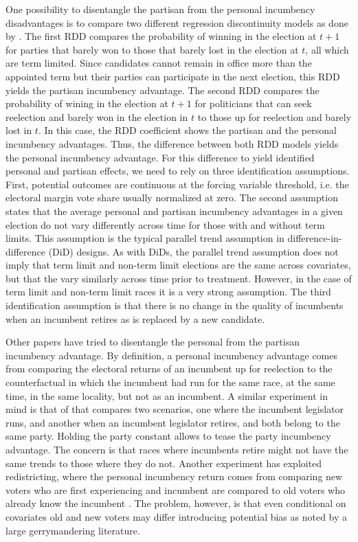 One possibility to disentangle the partisan from the personal incumbency disadvantages is to compare two different regression discontinuity models as done by \citet{fowler_hall_2014}. The first RDD compares the probability of winning in the election at $t+1$ for parties that barely won to those that barely lost in the election at $t$, all which are term limited. Since candidates cannot remain in office more than the appointed term but their parties can participate in the next election, this RDD yields the partisan incumbency advantage. The second RDD compares the probability of wining in the election at $t+1$ for politicians that can seek reelection and barely won in the election in $t$ to those up for reelection and barely lost in $t$. In this case, the RDD coefficient shows the partisan and the personal incumbency advantages. Thus, the difference between both RDD models yields the personal incumbency advantage. For this difference to yield identified personal and partisan effects, we need to rely on three identification assumptions. First, potential outcomes are continuous at the forcing variable threshold, i.e. the electoral margin vote share usually normalized at zero. The second assumption states that the average personal and partisan incumbency advantages in a given election do not vary differently across time for those with and without term limits. This assumption is the typical parallel trend assumption in difference-in-difference (DiD) designs. As with DiDs, the parallel trend assumption does not imply that term limit and non-term limit elections are the same across covariates, but that the vary similarly across time prior to treatment. However, in the case of term limit and non-term limit races it is a very strong assumption. The third identification assumption is that there is no change in the quality of incumbents when an incumbent retires as is replaced by a new candidate. 

Other papers have tried to disentangle the personal from the partisan incumbency advantage. By definition, a personal incumbency advantage comes from comparing the electoral returns of an incumbent up for reelection to the counterfactual in which the incumbent had run for the same race, at the same time, in the same locality, but not as an incumbent. A similar experiment in mind is that of \citet{gelman_king_1990} that compares two scenarios, one where the incumbent legislator runs, and another when an incumbent legislator retires, and both belong to the same party. Holding the party constant allows to tease the party incumbency advantage. The concern is that races where incumbents retire might not have the same trends to those where they do not. Another experiment has exploited redistricting, where the personal incumbency return comes from comparing  new voters who are first experiencing and incumbent are compared to old voters who already know the incumbent \citep{sekhon_titiunik_2012}. The problem, however, is that even conditional on covariates old and new voters may differ introducing potential bias as noted by a large gerrymandering literature. 

